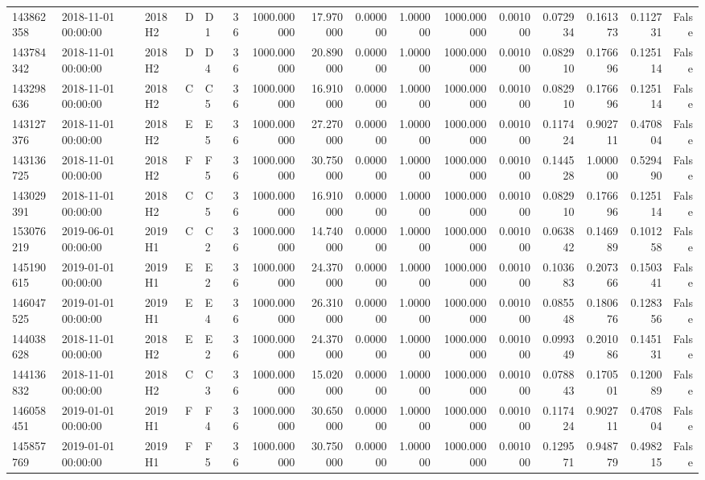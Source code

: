 \begin{tabular}{lllllrrrrrrrrrrr}
143862358 & 2018-11-01 00:00:00 & 2018H2 & D & D1 & 36 & 1000.000000 & 17.970000 & 0.000000 & 1.000000 & 1000.000000 & 0.001000 & 0.072934 & 0.161373 & 0.112731 & False \\
143784342 & 2018-11-01 00:00:00 & 2018H2 & D & D4 & 36 & 1000.000000 & 20.890000 & 0.000000 & 1.000000 & 1000.000000 & 0.001000 & 0.082910 & 0.176696 & 0.125114 & False \\
143298636 & 2018-11-01 00:00:00 & 2018H2 & C & C5 & 36 & 1000.000000 & 16.910000 & 0.000000 & 1.000000 & 1000.000000 & 0.001000 & 0.082910 & 0.176696 & 0.125114 & False \\
143127376 & 2018-11-01 00:00:00 & 2018H2 & E & E5 & 36 & 1000.000000 & 27.270000 & 0.000000 & 1.000000 & 1000.000000 & 0.001000 & 0.117424 & 0.902711 & 0.470804 & False \\
143136725 & 2018-11-01 00:00:00 & 2018H2 & F & F5 & 36 & 1000.000000 & 30.750000 & 0.000000 & 1.000000 & 1000.000000 & 0.001000 & 0.144528 & 1.000000 & 0.529490 & False \\
143029391 & 2018-11-01 00:00:00 & 2018H2 & C & C5 & 36 & 1000.000000 & 16.910000 & 0.000000 & 1.000000 & 1000.000000 & 0.001000 & 0.082910 & 0.176696 & 0.125114 & False \\
153076219 & 2019-06-01 00:00:00 & 2019H1 & C & C2 & 36 & 1000.000000 & 14.740000 & 0.000000 & 1.000000 & 1000.000000 & 0.001000 & 0.063842 & 0.146989 & 0.101258 & False \\
145190615 & 2019-01-01 00:00:00 & 2019H1 & E & E2 & 36 & 1000.000000 & 24.370000 & 0.000000 & 1.000000 & 1000.000000 & 0.001000 & 0.103683 & 0.207366 & 0.150341 & False \\
146047525 & 2019-01-01 00:00:00 & 2019H1 & E & E4 & 36 & 1000.000000 & 26.310000 & 0.000000 & 1.000000 & 1000.000000 & 0.001000 & 0.085548 & 0.180676 & 0.128356 & False \\
144038628 & 2018-11-01 00:00:00 & 2018H2 & E & E2 & 36 & 1000.000000 & 24.370000 & 0.000000 & 1.000000 & 1000.000000 & 0.001000 & 0.099349 & 0.201086 & 0.145131 & False \\
144136832 & 2018-11-01 00:00:00 & 2018H2 & C & C3 & 36 & 1000.000000 & 15.020000 & 0.000000 & 1.000000 & 1000.000000 & 0.001000 & 0.078843 & 0.170501 & 0.120089 & False \\
146058451 & 2019-01-01 00:00:00 & 2019H1 & F & F4 & 36 & 1000.000000 & 30.650000 & 0.000000 & 1.000000 & 1000.000000 & 0.001000 & 0.117424 & 0.902711 & 0.470804 & False \\
145857769 & 2019-01-01 00:00:00 & 2019H1 & F & F5 & 36 & 1000.000000 & 30.750000 & 0.000000 & 1.000000 & 1000.000000 & 0.001000 & 0.129571 & 0.948779 & 0.498215 & False \\

\end{tabular}
